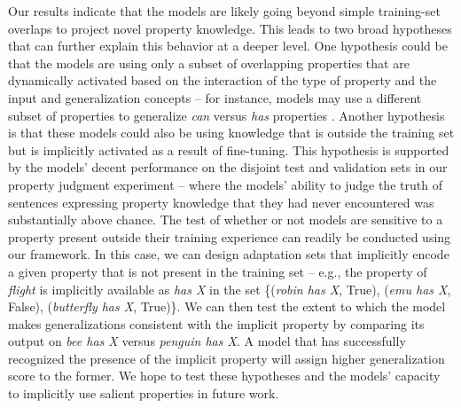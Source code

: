 \documentclass[10pt,letterpaper]{article}
\begin{document}
Our results indicate that the models are likely going beyond simple training-set overlaps to project novel property knowledge.
This leads to two broad hypotheses that can further explain this behavior at a deeper level.
One hypothesis could be that the models are using only a subset of overlapping properties that are dynamically activated based on the interaction of the type of property and the input and generalization concepts -- for instance, models may use a different subset of properties to generalize \textit{can} versus \textit{has} properties \citep{rogers2004semantic}.
Another hypothesis is that these models could also be using knowledge that is outside the training set but is implicitly activated as a result of fine-tuning. 
This hypothesis is supported by the models' decent performance on the disjoint test and validation sets in our property judgment experiment -- where the models' ability to judge the truth of sentences expressing property knowledge that they had never encountered was substantially above chance.
The test of whether or not models are sensitive to a property present outside their training experience can readily be conducted using our framework.
In this case, we can design adaptation sets that implicitly encode a given property that is not present in the training set -- e.g., the property of \textit{flight} is implicitly available as \textit{has X} in the set \{(\textit{robin has X}, True), (\textit{emu has X}, False), (\textit{butterfly has X}, True)\}. We can then test the extent to which the model makes generalizations consistent with the implicit property by comparing its output on \textit{bee has X} versus \textit{penguin has X}. A model that has successfully recognized the presence of the implicit property will assign higher generalization score to the former.
We hope to test these hypotheses and the models' capacity to implicitly use salient properties in future work.
\end{document}
